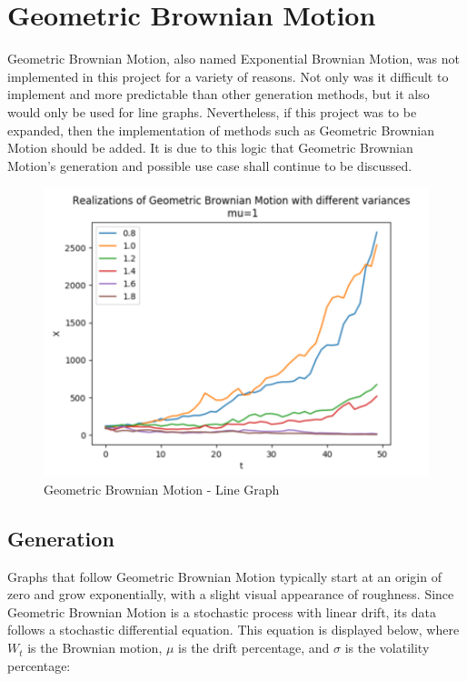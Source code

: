 \section{Geometric Brownian Motion}
Geometric Brownian Motion, also named Exponential Brownian Motion, was not implemented in this project for a variety of reasons. Not only was it difficult to implement and more predictable than other generation methods, but it also would only be used for line graphs. Nevertheless, if this project was to be expanded, then the implementation of methods such as Geometric Brownian Motion should be added. It is due to this logic that Geometric Brownian Motion's generation and possible use case shall continue to be discussed.

\begin{figure}[hbt]
    \centering
    \includegraphics[width=375pt,keepaspectratio]{figures/body/methodology/geometric_example.png}
    \caption{Geometric Brownian Motion - Line Graph \cite{geometric_brownian_motion}}
    \label{figure:geometric_example}
\end{figure}

\subsection{Generation}
Graphs that follow Geometric Brownian Motion typically start at an origin of zero and grow exponentially, with a slight visual appearance of roughness. Since Geometric Brownian Motion is a stochastic process with linear drift, its data follows a stochastic differential equation. This equation is displayed below, where \(W_t\) is the Brownian motion, \(\mu\) is the drift percentage, and \(\sigma\) is the volatility percentage:

